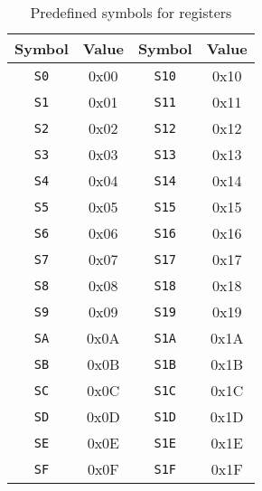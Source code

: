                 \begin{table}[h!]
                    \centering
                    \begin{tabular}{|cc|cc|}
                        \hline
                        \textbf{Symbol} & \textbf{Value} & \textbf{Symbol} & \textbf{Value} \\\hline
                        \texttt{S0}     & 0x00           & \texttt{S10}    & 0x10           \\\hline
                        \texttt{S1}     & 0x01           & \texttt{S11}    & 0x11           \\\hline
                        \texttt{S2}     & 0x02           & \texttt{S12}    & 0x12           \\\hline
                        \texttt{S3}     & 0x03           & \texttt{S13}    & 0x13           \\\hline
                        \texttt{S4}     & 0x04           & \texttt{S14}    & 0x14           \\\hline
                        \texttt{S5}     & 0x05           & \texttt{S15}    & 0x15           \\\hline
                        \texttt{S6}     & 0x06           & \texttt{S16}    & 0x16           \\\hline
                        \texttt{S7}     & 0x07           & \texttt{S17}    & 0x17           \\\hline
                        \texttt{S8}     & 0x08           & \texttt{S18}    & 0x18           \\\hline
                        \texttt{S9}     & 0x09           & \texttt{S19}    & 0x19           \\\hline
                        \texttt{SA}     & 0x0A           & \texttt{S1A}    & 0x1A           \\\hline
                        \texttt{SB}     & 0x0B           & \texttt{S1B}    & 0x1B           \\\hline
                        \texttt{SC}     & 0x0C           & \texttt{S1C}    & 0x1C           \\\hline
                        \texttt{SD}     & 0x0D           & \texttt{S1D}    & 0x1D           \\\hline
                        \texttt{SE}     & 0x0E           & \texttt{S1E}    & 0x1E           \\\hline
                        \texttt{SF}     & 0x0F           & \texttt{S1F}    & 0x1F           \\\hline
                    \end{tabular}
                    \caption{Predefined symbols for registers}
                \end{table}

